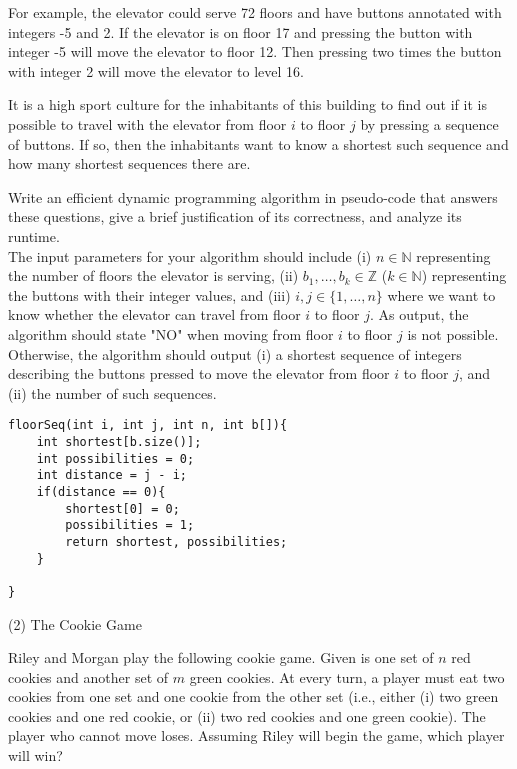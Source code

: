 \documentclass[11pt]{amsart}
\begin{document}
For example, the elevator could serve 72 floors and have buttons annotated with integers -5 and 2. If the elevator is on
floor 17 and pressing the button with integer -5 will move the elevator to floor 12. Then pressing two times the button with
integer 2 will move the elevator to level 16.\medskip

It is a high sport culture for the inhabitants of this building to find out if it is possible to travel with the elevator from floor
$i$ to floor $j$ by pressing a sequence of buttons. If so, then the inhabitants want to know a shortest such sequence
and how many shortest sequences there are.\medskip

Write an efficient dynamic programming algorithm in pseudo-code that answers these questions, give a brief justification
of its correctness, and analyze its runtime.\\

The input parameters for your algorithm should include (i) $n\in \mathbb{N}$ representing the number of floors the 
elevator is serving, (ii) $b_1,\ldots, b_k \in \mathbb{Z}$ ($k\in\mathbb{N}$) representing the buttons with their
integer values, and (iii) $i,j \in \{1,\ldots , n\}$ where we want to know whether the elevator can travel from floor $i$ to floor $j$.
As output, the algorithm should state "NO" when moving from floor $i$ to floor $j$ is not possible. Otherwise, the 
algorithm should output (i) a shortest sequence of integers describing the buttons pressed to move the elevator from floor
$i$ to floor $j$, and (ii) the number of such sequences.

\newpage
\begin{lstlisting}
floorSeq(int i, int j, int n, int b[]){
    int shortest[b.size()];
    int possibilities = 0;
    int distance = j - i;
    if(distance == 0){
        shortest[0] = 0;
        possibilities = 1;
        return shortest, possibilities;
    }
    
}
\end{lstlisting}
\newpage

(2) The Cookie Game\medskip

Riley and Morgan play the following cookie game. Given is one set of $n$ red cookies and another set of $m$ green 
cookies. At every turn, a player must eat two cookies from one set and one cookie from the other set (i.e., 
either (i) two green cookies and one red cookie, or (ii) two red cookies and one green cookie). The player who 
cannot move loses. Assuming Riley will begin the game, which player will win?\medskip
\end{document}
